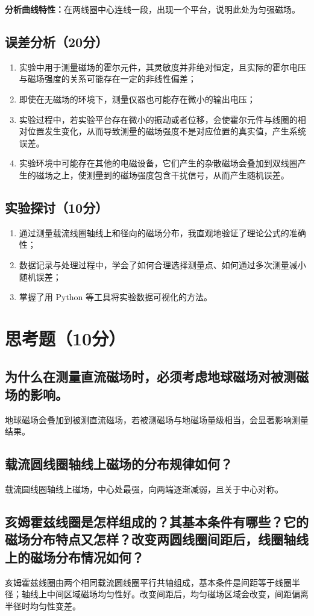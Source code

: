 \documentclass[]{../../templates/Report}%
\begin{document}
\begin{fullreportonly}
\textbf{分析曲线特性：}在两线圈中心连线一段，出现一个平台，说明此处为匀强磁场。
\subsection{误差分析（20分）}
\begin{enumerate}
    \item 实验中用于测量磁场的霍尔元件，其灵敏度并非绝对恒定，且实际的霍尔电压与磁场强度的关系可能存在一定的非线性偏差；
    \item 即使在无磁场的环境下，测量仪器也可能存在微小的输出电压；
    \item 实验过程中，若实验平台存在微小的振动或者位移，会使霍尔元件与线圈的相对位置发生变化，从而导致测量的磁场强度不是对应位置的真实值，产生系统误差。
    \item 实验环境中可能存在其他的电磁设备，它们产生的杂散磁场会叠加到双线圈产生的磁场之上，使测量到的磁场强度包含干扰信号，从而产生随机误差。
\end{enumerate}

\subsection{实验探讨（10分）}
\begin{enumerate}
    \item 通过测量载流线圈轴线上和径向的磁场分布，我直观地验证了理论公式的准确性；
    \item 数据记录与处理过程中，学会了如何合理选择测量点、如何通过多次测量减小随机误差；
    \item 掌握了用 Python 等工具将实验数据可视化的方法。
\end{enumerate}

\section{思考题（10分）}
\subsection{为什么在测量直流磁场时，必须考虑地球磁场对被测磁场的影响。}
地球磁场会叠加到被测直流磁场，若被测磁场与地磁场量级相当，会显著影响测量结果。
\subsection{载流圆线圈轴线上磁场的分布规律如何？}
载流圆线圈轴线上磁场，中心处最强，向两端逐渐减弱，且关于中心对称。
\subsection{亥姆霍兹线圈是怎样组成的？其基本条件有哪些？它的磁场分布特点又怎样？改变两圆线圈间距后，线圈轴线上的磁场分布情况如何？}
亥姆霍兹线圈由两个相同载流圆线圈平行共轴组成，基本条件是间距等于线圈半径；轴线上中间区域磁场均匀性好。改变间距后，均匀磁场区域会改变，间距偏离半径时均匀性变差。

\end{fullreportonly}
\end{document}
